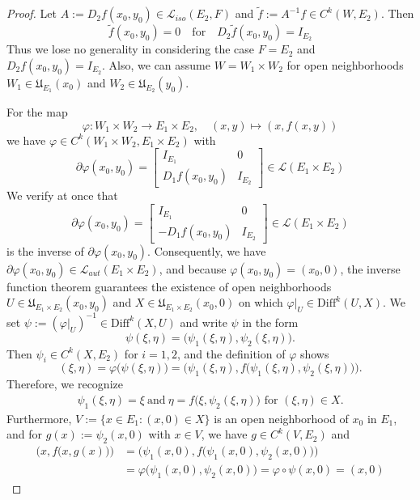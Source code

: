 \begin{proof}
Let $A:=D_2f(x_0,y_0)\in \mathcal{L}_{iso}(E_2,F)$ and $\tilde{f}:=A^{-1}f\in C^k(W,E_2)$. Then
\[\tilde{f}(x_0,y_0)=0\quad\text{for}\quad D_2\tilde{f}(x_0,y_0)=I_{E_2}\]
Thus we lose no generality in considering the case $F=E_2$
and $D_2f(x_0,y_0)=I_{E_2}$. Also, we can assume $W=W_1\times W_2$ for open neighborhoods $W_1\in \mathfrak{U}_{E_1}(x_0)$ and $W_2\in \mathfrak{U}_{E_2}(y_0)$.\par
For the map
\[\varphi: W_1\times W_2\to E_1\times E_2,\quad (x,y)\mapsto (x,f(x,y))\]
we have $\varphi\in C^k(W_1\times W_2, E_1\times E_2)$ with
\[\partial \varphi(x_0,y_0)=\begin{bmatrix}
I_{E_1} & 0\\
D_1f(x_0,y_0) & I_{E_2}
\end{bmatrix}\in\mathcal{L}(E_1\times E_2)\]
We verify at once that
\[\partial \varphi(x_0,y_0)=\begin{bmatrix}
I_{E_1} & 0\\
-D_1f(x_0,y_0) & I_{E_2}
\end{bmatrix}\in\mathcal{L}(E_1\times E_2)\]
is the inverse of $\partial\varphi(x_0,y_0)$. Consequently, we have $\partial\varphi(x_0,y_0)\in\mathcal{L}_{aut}(E_1\times E_2)$, and because $\varphi(x_0,y_0)=(x_0,0)$, the inverse function theorem guarantees the existence of open neighborhoods $U\in\mathfrak{U}_{E_1\times E_2}(x_0,y_0)$ and $X\in\mathfrak{U}_{E_1\times E_2}(x_0, 0)$ on which $\varphi|_U\in\mathrm{Diff}^k(U,X)$. We set $\psi:=(\varphi|_U)^{-1}\in \mathrm{Diff}^k(X,U)$ and write $\psi$ in the form
\[\psi(\xi,\eta)=\big(\psi_1(\xi,\eta),\psi_2(\xi,\eta)\big).\]
Then $\psi_i\in C^k(X,E_2)$ for $i=1,2$, and the definition of $\varphi$ shows
\[(\xi,\eta)=\varphi\big(\psi(\xi,\eta)\big)=\big(\psi_1(\xi,\eta),f\big(\psi_1(\xi,\eta),\psi_2(\xi,\eta)\big)\big).\]
Therefore, we recognize
\begin{align}\label{implicit function-3}
\psi_1(\xi,\eta)=\xi\ \text{and}\ \eta=f\big(\xi,\psi_2(\xi,\eta)\big)\text{ for }(\xi,\eta)\in X.
\end{align}
Furthermore, $V:=\{x\in E_1:(x,0)\in X\}$ is an open neighborhood of $x_0$ in $E_1$, and for $g(x):=\psi_2(x,0)$ with $x\in V$, we have $g\in C^k(V,E_2)$ and
\begin{align*}
\big(x,f\big(x,g(x)\big)\big)&=\big(\psi_1(x,0),f\big(\psi_1(x,0),\psi_2(x,0)\big)\big)\\
&=\varphi\big(\psi_1(x,0),\psi_2(x,0)\big)=\varphi\circ\psi (x,0)=(x,0)
\end{align*}

\end{proof}
